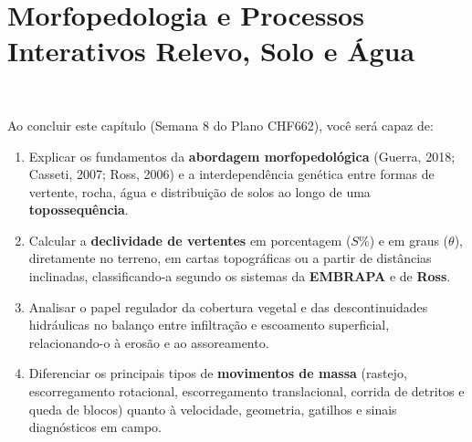 
\chapter{Morfopedologia e Processos Interativos Relevo, Solo e Água}
\label{cap:morfopedologia}

\noindent\tagEmenta\ \tagPratica
\par\vspace{6pt}

\begin{capObjetivos}
Ao concluir este capítulo (Semana 8 do Plano CHF662), você será capaz de:
\begin{enumerate}[leftmargin=1.6em, itemsep=2pt]
  \item Explicar os fundamentos da \textbf{abordagem morfopedológica} (Guerra, 2018; Casseti, 2007; Ross, 2006) e a interdependência genética entre formas de vertente, rocha, água e distribuição de solos ao longo de uma \textbf{topossequência}.
  \item Calcular a \textbf{declividade de vertentes} em porcentagem ($S\%$) e em graus ($\theta$), diretamente no terreno, em cartas topográficas ou a partir de distâncias inclinadas, classificando-a segundo os sistemas da \textbf{EMBRAPA} e de \textbf{Ross}.
  \item Analisar o papel regulador da cobertura vegetal e das descontinuidades hidráulicas no balanço entre infiltração e escoamento superficial, relacionando-o à erosão e ao assoreamento.
  \item Diferenciar os principais tipos de \textbf{movimentos de massa} (rastejo, escorregamento rotacional, escorregamento translacional, corrida de detritos e queda de blocos) quanto à velocidade, geometria, gatilhos e sinais diagnósticos em campo.
\end{enumerate}
\end{capObjetivos}

